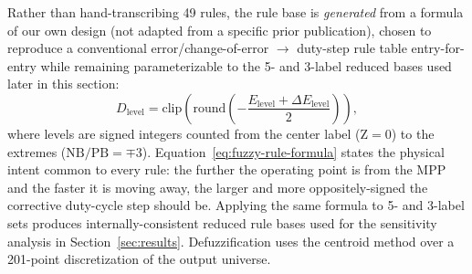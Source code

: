 Rather than hand-transcribing 49 rules, the rule base is \emph{generated}
from a formula of our own design (not adapted from a specific prior
publication), chosen to reproduce a conventional error/change-of-error
$\to$ duty-step rule table entry-for-entry while remaining parameterizable
to the 5- and 3-label reduced bases used later in this section:
\begin{equation}
D_{\text{level}} = \mathrm{clip}\!\left(\mathrm{round}\!\left(
  -\frac{E_{\text{level}} + \Delta E_{\text{level}}}{2}\right)\right),
\label{eq:fuzzy-rule-formula}
\end{equation}
where levels are signed integers counted from the center label
($\mathrm{Z}=0$) to the extremes ($\mathrm{NB}/\mathrm{PB}=\mp3$).
Equation~\eqref{eq:fuzzy-rule-formula} states the physical intent common to
every rule: the further the operating point is from the MPP and the faster
it is moving away, the larger and more oppositely-signed the corrective
duty-cycle step should be. Applying the same formula to 5- and 3-label sets
produces internally-consistent reduced rule bases used for the sensitivity
analysis in Section~\ref{sec:results}. Defuzzification uses the centroid
method over a 201-point discretization of the output universe.

